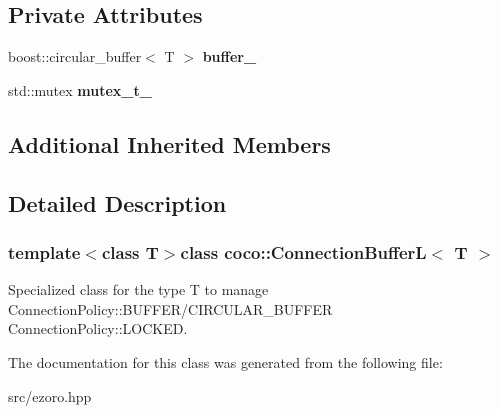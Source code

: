\subsection*{Private Attributes}
\begin{DoxyCompactItemize}
\item 
\hypertarget{classcoco_1_1_connection_buffer_l_ab5751072ac523ef93ee8d91b931665fc}{boost\-::circular\-\_\-buffer$<$ T $>$ {\bfseries buffer\-\_\-}}\label{classcoco_1_1_connection_buffer_l_ab5751072ac523ef93ee8d91b931665fc}

\item 
\hypertarget{classcoco_1_1_connection_buffer_l_a11e0301f390b46e9c0cc92d7d8634f7a}{std\-::mutex {\bfseries mutex\-\_\-t\-\_\-}}\label{classcoco_1_1_connection_buffer_l_a11e0301f390b46e9c0cc92d7d8634f7a}

\end{DoxyCompactItemize}
\subsection*{Additional Inherited Members}


\subsection{Detailed Description}
\subsubsection*{template$<$class T$>$class coco\-::\-Connection\-Buffer\-L$<$ T $>$}

Specialized class for the type T to manage Connection\-Policy\-::\-B\-U\-F\-F\-E\-R/\-C\-I\-R\-C\-U\-L\-A\-R\-\_\-\-B\-U\-F\-F\-E\-R Connection\-Policy\-::\-L\-O\-C\-K\-E\-D. 

The documentation for this class was generated from the following file\-:\begin{DoxyCompactItemize}
\item 
src/ezoro.\-hpp\end{DoxyCompactItemize}
